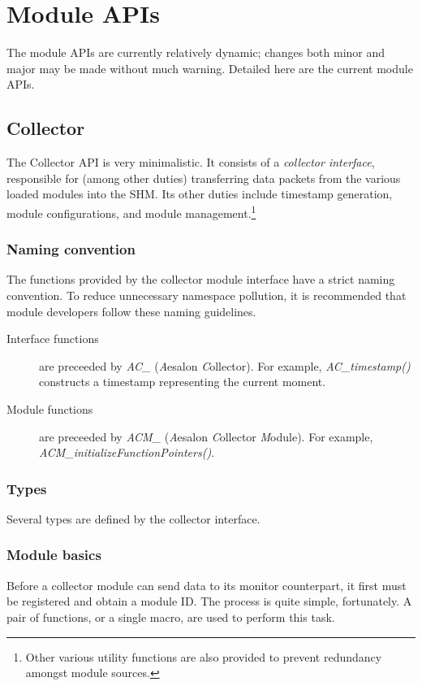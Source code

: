 \chapter{Module APIs}
The module APIs are currently relatively dynamic; changes both minor and major may be made without much warning.
Detailed here are the current module APIs.
\section{Collector}
The Collector API is very minimalistic. It consists of a \emph{collector interface}, responsible for (among other
duties)
transferring data packets from the various loaded modules into the SHM. Its other duties include timestamp generation,
module configurations, and module management.\footnote{Other various utility functions are also provided to prevent
redundancy amongst module sources.}

\subsection{Naming convention}
The functions provided by the collector module interface have a strict naming convention. To reduce unnecessary
namespace
pollution, it is recommended that module developers follow these naming guidelines.
\begin{description}
 \item[Interface functions] are preceeded by \emph{AC\_} (\emph{A}esalon \emph{C}ollector). For example,
\emph{AC\_timestamp()}
constructs a timestamp representing the current moment.
 \item[Module functions] are preceeded by \emph{ACM\_} (\emph{A}esalon \emph{C}ollector \emph{M}odule). For example,
\emph{ACM\_initializeFunctionPointers()}.
\end{description}

\subsection{Types}
Several types are defined by the collector interface.


\subsection{Module basics}
Before a collector module can send data to its monitor counterpart, it first must be registered and obtain a module ID.
The process is quite simple, fortunately. A pair of functions, or a single macro, are used to perform this task.

